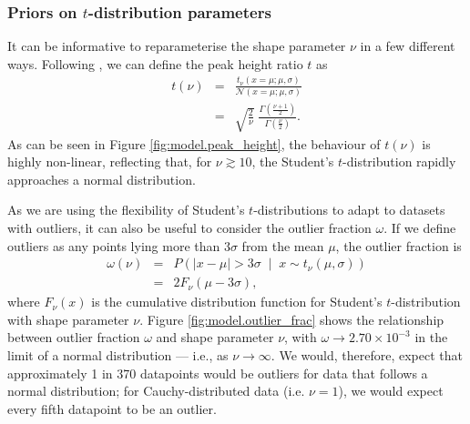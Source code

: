 \documentclass[fleqn,usenatbib]{mnras}
\newcommand{\studentt}[2]{t_\nu \left( #1, #2 \right)}
\begin{document}
\subsubsection{Priors on $t$-distribution parameters}
\label{sec:formalism.sampling.prior}

It can be informative to reparameterise the shape parameter $\nu$ in a few
different ways. Following \citet{Feeney:2018}, we can define the peak height
ratio $t$ as
\begin{eqnarray}
    t(\nu) &=& \frac{
        \studentt{x = \mu; \mu}{\sigma}
    }{
        \mathcal N \left(x = \mu; \mu, \sigma \right)
    } \\
    &=& \sqrt{\frac{2}{\nu}} \;
    \frac{
        \Gamma\left(\frac{\nu + 1}{2}\right)
    }{
        \Gamma\left(\frac{\nu}{2}\right)
    }.
\end{eqnarray}
As can be seen in Figure \ref{fig:model.peak_height}, the behaviour of $t(\nu)$
is highly non-linear, reflecting that, for $\nu \gtrsim 10$, the Student's
$t$-distribution rapidly approaches a normal distribution.


As we are using the flexibility of Student's $t$-distributions to adapt to
datasets with outliers, it can also be useful to consider the outlier fraction
$\omega$. If we define outliers as any points lying more than $3\sigma$ from the
mean $\mu$, the outlier fraction is
\begin{eqnarray}
    \omega(\nu)
    &=& P\left(
        \left|x - \mu \right| > 3 \sigma \;
        \middle| \;
        x \sim \studentt{\mu}{\sigma}
    \right) \\
    &=& 2 F_\nu \left(\mu - 3 \sigma \right),
\end{eqnarray}
where $F_\nu(x)$ is the cumulative distribution function for Student's
$t$-distribution with shape parameter $\nu$. Figure \ref{fig:model.outlier_frac}
shows the relationship between outlier fraction $\omega$ and shape parameter
$\nu$, with $\omega \rightarrow 2.70 \times 10^{-3} $ in the limit of a normal
distribution --- i.e., as $\nu \rightarrow \infty$. We would, therefore, expect
that approximately 1 in 370 datapoints would be outliers for data that follows a
normal distribution\footnotemark; for Cauchy-distributed data (i.e. $\nu = 1$),
we would expect every fifth datapoint to be an outlier.
\end{document}
